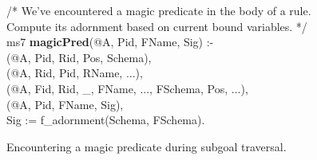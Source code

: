 \begin{figure}[!t]
\ssp
\centering
\begin{boxedminipage}{\linewidth}
/* We've encountered a magic predicate in the body of a rule. \\
   Compute its adornment based on current bound variables. */ \\
ms7 {\bf magicPred}(@A, Pid, FName, Sig) :- \\
(@A, Pid, Rid, Pos, Schema), \\
(@A, Rid, Pid, RName, ...), \\
(@A, Fid, Rid, \_, FName, ..., FSchema, Pos, ...), \\
(@A, Pid, FName, Sig), \\
\datalogspace Sig := f\_adornment(Schema, FSchema).

\end{boxedminipage}
\caption{\label{ch:evita:fig:mpgoal}Encountering a magic predicate during subgoal traversal.}
\end{figure}

